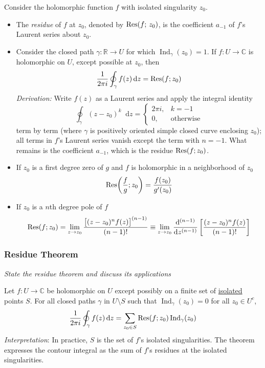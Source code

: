 \documentclass[11pt, a4paper]{article}
\newcommand{\question}[1]{\textit{#1}\vspace{2mm}}
\newcommand{\R}{\mathbb{R}} %
\newcommand{\C}{\mathbb{C}} %
\newcommand{\diff}{\mathop{}\!\mathrm{d}} %
\begin{document}
Consider the holomorphic function $ f $ with isolated singularity $ z_{0} $.
\begin{itemize}
	\item The \textit{residue} of $ f $ at $ z_{0} $, denoted by $ \Res(f;\, z_0) $, is the coefficient $ a_{-1} $ of $ f $'s Laurent series about $ z_0 $.

	\item Consider the closed path $ \gamma : \R \to U $ for which $ \operatorname{Ind}_{\gamma}(z_0) = 1$. If $ f : U \to \C $ is holomorphic on $ U $, except possible at $ z_{0} $, then
	\begin{align*}
		\frac{1}{2\pi i}\oint_{\gamma}f(z)\diff z = \Res(f; z_0)
	\end{align*}
	\textit{Derivation:} Write $ f(z) $ as a Laurent series and apply the integral identity
	\[
		\oint_{\gamma}(z-z_{0})^{k} \diff z = 
		\begin{cases}
			2\pi i, & k = -1\\
			0, & \text{otherwise}
		\end{cases}
	\]
	term by term (where $ \gamma $ is positively oriented simple closed curve enclosing $ z_{0} $); all terms in $ f $'s Laurent series vanish except the term with $ n = -1 $. What remains is the coefficient $ a_{-1} $, which is the residue $ \Res(f; z_0) $.
		
	\item If $ z_0  $ is a first degree zero of $ g $ and $ f $ is holomorphic in a neighborhood of $ z_0 $
	\begin{equation*}
		\Res(\frac{f}{g}; z_0) = \frac{f(z_0)}{g'(z_0)}
	\end{equation*}
	
	\item If $ z_0 $ is a $ n $th degree pole of $ f $
	\begin{equation*}
		\Res(f; z_0) = \lim_{z \to z_0} \frac{\big[  (z-z_0)^n f(z)\big]^{(n-1)}}{(n-1)!} \equiv \lim_{z\to z_0} \dv[(n-1)]{}{z} \left[\frac{(z-z_0)^n f(z)}{(n-1)!}\right]
	\end{equation*}
	
\end{itemize}


\subsubsection{Residue Theorem}
\question{State the residue theorem and discuss its applications}

Let $ f : U \to  \C $ be holomorphic on $ U $ except possibly on a finite set of \underline{isolated} points $ S $. For all closed paths $ \gamma $ in $ U \setminus S $ such that $ \operatorname{Ind}_{\gamma}(z_0) = 0$ for all $ z_0 \in U^{c} $,
\begin{equation*}
	\frac{1}{2\pi i} \oint_{\gamma}f(z) \diff z = \sum_{z_0 \in S} \Res(f; z_0) \operatorname{Ind}_{\gamma}(z_0)
\end{equation*}
\textit{Interpretation}: In practice, $ S $ is the set of $ f $'s isolated singularities. The theorem expresses the contour integral as the sum of $ f $'s residues at the isolated singularities.
\end{document}
